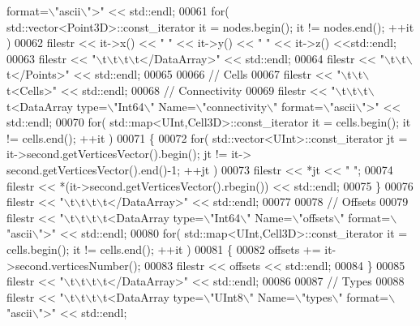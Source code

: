 \begin{DoxyCode}
{       format=\(\backslash\)"ascii\(\backslash\)">"} << std::endl;
00061     \textcolor{keywordflow}{for}( std::vector<Point3D>::const\_iterator it = nodes.begin(); it != nodes.end(); ++it )
00062         filestr << it->x() << \textcolor{stringliteral}{" "} << it->y() << \textcolor{stringliteral}{" "} << it->z() <<std::endl;
00063     filestr << \textcolor{stringliteral}{"\(\backslash\)t\(\backslash\)t\(\backslash\)t\(\backslash\)t</DataArray>"} << std::endl;
00064     filestr << \textcolor{stringliteral}{"\(\backslash\)t\(\backslash\)t\(\backslash\)t</Points>"} << std::endl;
00065 
00066     \textcolor{comment}{// Cells}
00067     filestr << \textcolor{stringliteral}{"\(\backslash\)t\(\backslash\)t\(\backslash\)t<Cells>"} << std::endl;
00068     \textcolor{comment}{//  Connectivity}
00069     filestr << \textcolor{stringliteral}{"\(\backslash\)t\(\backslash\)t\(\backslash\)t\(\backslash\)t<DataArray type=\(\backslash\)"Int64\(\backslash\)" Name=\(\backslash\)"connectivity\(\backslash\)" format=\(\backslash\)"ascii\(\backslash\)">"} << std::endl;
00070     \textcolor{keywordflow}{for}( std::map<UInt,Cell3D>::const\_iterator it = cells.begin(); it != cells.end(); ++it )
00071     \{
00072         \textcolor{keywordflow}{for}( std::vector<UInt>::const\_iterator jt = it->second.getVerticesVector().begin(); jt != it->
      second.getVerticesVector().end()-1; ++jt )
00073             filestr << *jt << \textcolor{stringliteral}{" "};
00074         filestr << *(it->second.getVerticesVector().rbegin()) << std::endl;
00075     \}
00076     filestr << \textcolor{stringliteral}{"\(\backslash\)t\(\backslash\)t\(\backslash\)t\(\backslash\)t</DataArray>"} << std::endl;
00077 
00078     \textcolor{comment}{//  Offsets}
00079     filestr << \textcolor{stringliteral}{"\(\backslash\)t\(\backslash\)t\(\backslash\)t\(\backslash\)t<DataArray type=\(\backslash\)"Int64\(\backslash\)" Name=\(\backslash\)"offsets\(\backslash\)" format=\(\backslash\)"ascii\(\backslash\)">"} << std::endl;
00080     \textcolor{keywordflow}{for}( std::map<UInt,Cell3D>::const\_iterator it = cells.begin(); it != cells.end(); ++it )
00081     \{
00082         offsets += it->second.verticesNumber();
00083         filestr << offsets << std::endl;
00084     \}
00085     filestr << \textcolor{stringliteral}{"\(\backslash\)t\(\backslash\)t\(\backslash\)t\(\backslash\)t</DataArray>"} << std::endl;
00086 
00087     \textcolor{comment}{//  Types}
00088     filestr << \textcolor{stringliteral}{"\(\backslash\)t\(\backslash\)t\(\backslash\)t\(\backslash\)t<DataArray type=\(\backslash\)"UInt8\(\backslash\)" Name=\(\backslash\)"types\(\backslash\)" format=\(\backslash\)"ascii\(\backslash\)">"} << std::endl;

\end{DoxyCode}
